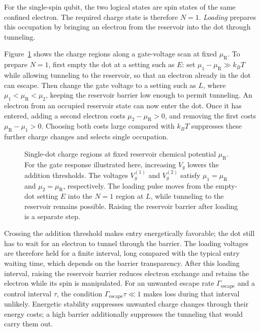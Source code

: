 For the single-spin qubit, the two logical states are spin states
of the same confined electron. The required charge state is therefore
$N=1$. \emph{Loading} prepares this occupation by bringing an electron
from the reservoir into the dot through tunneling.

Figure~\ref{fig:single-dot-loading} shows the charge regions along
a gate-voltage scan at fixed $\mu_{\mathrm R}$. To prepare $N=1$,
first empty the dot at a setting such as $E$:
set $\mu_1-\mu_{\mathrm R}\gg k_BT$ while allowing tunneling to the reservoir,
so that an electron already in the dot can escape. Then change the
gate voltage to a setting such as $L$, where
$\mu_1<\mu_{\mathrm R}<\mu_2$, keeping the reservoir barrier low
enough to permit tunneling. An electron from an occupied reservoir
state can now enter the dot. Once it has entered, adding a second
electron costs $\mu_2-\mu_{\mathrm R}>0$, and removing the first
costs $\mu_{\mathrm R}-\mu_1>0$. Choosing both costs large compared
with $k_BT$ suppresses these further charge changes and selects
single occupation.

\begin{figure}[htbp]
 \centering
 
 \caption{Single-dot charge regions at fixed reservoir chemical
 potential $\mu_{\mathrm R}$. For the gate response illustrated here,
 increasing $V_g$ lowers the addition thresholds. The voltages
 $V_g^{(1)}$ and $V_g^{(2)}$ satisfy $\mu_1=\mu_{\mathrm R}$ and
 $\mu_2=\mu_{\mathrm R}$, respectively. The loading pulse moves from
 the empty-dot setting $E$ into the $N=1$ region at $L$, while
 tunneling to the reservoir remains possible. Raising the reservoir
 barrier after loading is a separate step.}
 \label{fig:single-dot-loading}
\end{figure}

Crossing the addition threshold makes entry energetically favorable;
the dot still has to wait for an electron to tunnel through the
barrier. The loading voltages are therefore held for a finite
interval, long compared with the typical entry waiting time, which
depends on the barrier transparency. After this loading interval,
raising the reservoir barrier reduces electron exchange and retains
the electron while its spin is manipulated. For an unwanted escape
rate $\Gamma_{\mathrm{escape}}$ and a control interval $\tau$, the
condition $\Gamma_{\mathrm{escape}}\tau\ll1$ makes loss during that
interval unlikely. Energetic stability suppresses unwanted charge
changes through their energy costs; a high barrier additionally
suppresses the tunneling that would carry them out.

